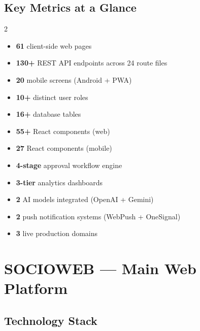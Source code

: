 \documentclass[12pt,a4paper]{article}
\begin{document}
\subsection{Key Metrics at a Glance}

\begin{multicols}{2}
\begin{itemize}[leftmargin=*]
    \item \textbf{61} client-side web pages
    \item \textbf{130+} REST API endpoints across 24 route files
    \item \textbf{20} mobile screens (Android + PWA)
    \item \textbf{10+} distinct user roles
    \item \textbf{16+} database tables
    \item \textbf{55+} React components (web)
    \item \textbf{27} React components (mobile)
    \item \textbf{4-stage} approval workflow engine
    \item \textbf{3-tier} analytics dashboards
    \item \textbf{2} AI models integrated (OpenAI + Gemini)
    \item \textbf{2} push notification systems (WebPush + OneSignal)
    \item \textbf{3} live production domains
\end{itemize}
\end{multicols}

\newpage
\section{SOCIOWEB — Main Web Platform}

\subsection{Technology Stack}
\end{document}

